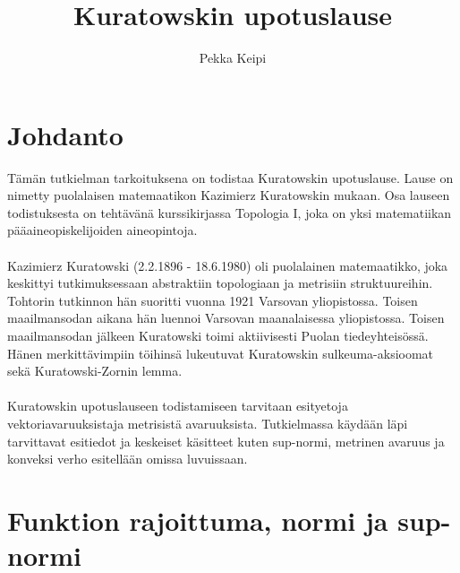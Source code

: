 \documentclass[12pt,a4paper,leqno]{report}
\title{Kuratowskin upotuslause}
\author{Pekka Keipi}
\theoremstyle{plain}
\theoremstyle{definition}
\theoremstyle{remark}
\begin{document}
\maketitle

\tableofcontents

\chapter{Johdanto}\label{johd}

Tämän tutkielman tarkoituksena on todistaa Kuratowskin upotuslause. Lause on nimetty puolalaisen matemaatikon Kazimierz Kuratowskin mukaan. Osa lauseen todistuksesta on tehtävänä kurssikirjassa Topologia I, joka on yksi matematiikan pääaineopiskelijoiden aineopintoja.
\\
\\
Kazimierz Kuratowski (2.2.1896 - 18.6.1980) oli puolalainen matemaatikko, joka keskittyi tutkimuksessaan abstraktiin topologiaan ja metrisiin struktuureihin. 
Tohtorin tutkinnon hän suoritti vuonna 1921 Varsovan yliopistossa. Toisen maailmansodan aikana hän luennoi Varsovan maanalaisessa yliopistossa. Toisen maailmansodan jälkeen Kuratowski toimi aktiivisesti Puolan tiedeyhteisössä.
Hänen merkittävimpiin töihinsä lukeutuvat Kuratowskin sulkeuma-aksioomat sekä Kuratowski-Zornin lemma.
\\
\\
Kuratowskin upotuslauseen todistamiseen tarvitaan esityetoja vektoriavaruuksistaja metrisistä avaruuksista. 
Tutkielmassa käydään läpi tarvittavat esitiedot ja keskeiset käsitteet kuten sup-normi, metrinen avaruus ja konveksi verho esitellään omissa luvuissaan.


\chapter{Funktion rajoittuma, normi ja sup-normi}\label{normi}
\end{document}
